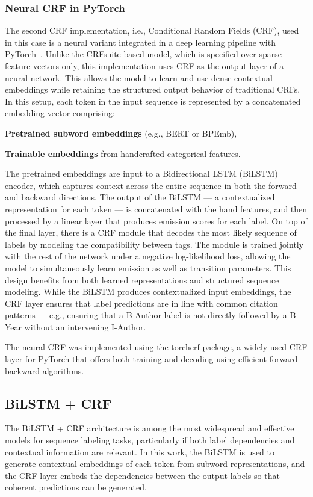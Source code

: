 \subsubsection{Neural CRF in PyTorch}
The second CRF implementation, i.e., Conditional Random Fields (CRF), used in this case is a neural variant integrated in a deep learning pipeline with PyTorch~\cite{torchcrf}. Unlike the CRFsuite-based model, which is specified over sparse feature vectors only, this implementation uses CRF as the output layer of a neural network. This allows the model to learn and use dense contextual embeddings while retaining the structured output behavior of traditional CRFs.
In this setup, each token in the input sequence is represented by a concatenated embedding vector comprising:
\begin{compactitem}
\item \textbf{Pretrained subword embeddings} (e.g., BERT or BPEmb),
\item \textbf{Trainable embeddings} from handcrafted categorical features.
\end{compactitem}
The pretrained embeddings are input to a Bidirectional LSTM (BiLSTM) encoder, which captures context across the entire sequence in both the forward and backward directions. The output of the BiLSTM — a contextualized representation for each token — is concatenated with the hand features, and then processed by a linear layer that produces emission scores for each label.
On top of the final layer, there is a CRF module that decodes the most likely sequence of labels by modeling the compatibility between tags. The module is trained jointly with the rest of the network under a negative log-likelihood loss, allowing the model to simultaneously learn emission as well as transition parameters.
This design benefits from both learned representations and structured sequence modeling. While the BiLSTM produces contextualized input embeddings, the CRF layer ensures that label predictions are in line with common citation patterns — e.g., ensuring that a B-Author label is not directly followed by a B-Year without an intervening I-Author.

The neural CRF was implemented using the torchcrf package, a widely used CRF layer for PyTorch that offers both training and decoding using efficient forward–backward algorithms.

\subsection{BiLSTM + CRF}
The BiLSTM + CRF architecture is among the most widespread and effective models for sequence labeling tasks, particularly if both label dependencies and contextual information are relevant. In this work, the BiLSTM is used to generate contextual embeddings of each token from subword representations, and the CRF layer embeds the dependencies between the output labels so that coherent predictions can be generated.

